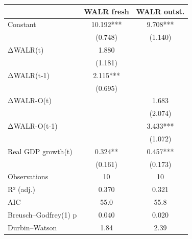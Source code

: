 \begin{tabular}{lcc}
\toprule
 & WALR fresh & WALR outst. \\
\midrule
Constant & 10.192*** & 9.708*** \\
   & (0.748) & (1.140) \\
ΔWALR(t) & 1.880 &  \\
     & (1.181) &  \\
ΔWALR(t-1) & 2.115*** &  \\
       & (0.695) &  \\
ΔWALR-O(t) &  & 1.683 \\
         &  & (2.074) \\
ΔWALR-O(t-1) &  & 3.433*** \\
           &  & (1.072) \\
Real GDP growth(t) & 0.324** & 0.457*** \\
             & (0.161) & (0.173) \\
Observations & 10 & 10 \\
R² (adj.) & 0.370 & 0.321 \\
AIC & 55.0 & 55.8 \\
Breusch–Godfrey(1) p & 0.040 & 0.020 \\
Durbin–Watson & 1.84 & 2.39 \\
\bottomrule
\end{tabular}
